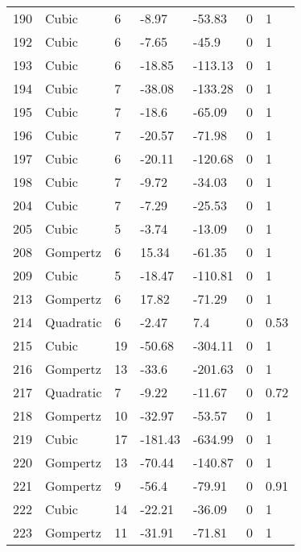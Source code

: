 \documentclass[11pt]{article}
\begin{document}
\begin{center}
\begin{longtable}{lllllll}
    190 & Cubic     & 6               & -8.97   & -53.83  & 0       & 1    \\
    192 & Cubic     & 6               & -7.65   & -45.9   & 0       & 1    \\
    193 & Cubic     & 6               & -18.85  & -113.13 & 0       & 1    \\
    194 & Cubic     & 7               & -38.08  & -133.28 & 0       & 1    \\
    195 & Cubic     & 7               & -18.6   & -65.09  & 0       & 1    \\
    196 & Cubic     & 7               & -20.57  & -71.98  & 0       & 1    \\
    197 & Cubic     & 6               & -20.11  & -120.68 & 0       & 1    \\
    198 & Cubic     & 7               & -9.72   & -34.03  & 0       & 1    \\
    204 & Cubic     & 7               & -7.29   & -25.53  & 0       & 1    \\
    205 & Cubic     & 5               & -3.74   & -13.09  & 0       & 1    \\
    208 & Gompertz  & 6               & 15.34   & -61.35  & 0       & 1    \\
    209 & Cubic     & 5               & -18.47  & -110.81 & 0       & 1    \\
    213 & Gompertz  & 6               & 17.82   & -71.29  & 0       & 1    \\
    214 & Quadratic & 6               & -2.47   & 7.4     & 0       & 0.53 \\
    215 & Cubic     & 19              & -50.68  & -304.11 & 0       & 1    \\
    216 & Gompertz  & 13              & -33.6   & -201.63 & 0       & 1    \\
    217 & Quadratic & 7               & -9.22   & -11.67  & 0       & 0.72 \\
    218 & Gompertz  & 10              & -32.97  & -53.57  & 0       & 1    \\
    219 & Cubic     & 17              & -181.43 & -634.99 & 0       & 1    \\
    220 & Gompertz  & 13              & -70.44  & -140.87 & 0       & 1    \\
    221 & Gompertz  & 9               & -56.4   & -79.91  & 0       & 0.91 \\
    222 & Cubic     & 14              & -22.21  & -36.09  & 0       & 1    \\
    223 & Gompertz  & 11              & -31.91  & -71.81  & 0       & 1    \\

\end{longtable}
\end{center}
\end{document}
